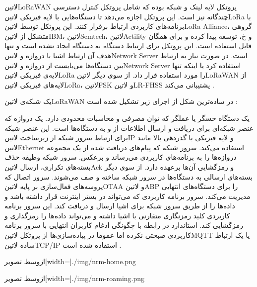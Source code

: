 ‌لاتین{LoRaWAN} پروتکل لایه لینک و شبکه بوده که شامل پروتکل کنترل دسترسی چندگانه نیز است.
این پروتکل اجازه می‌دهد تا دستگاه‌هایی با لایه فیزیکی ‌لاتین{LoRa} با برنامه‌های کاربردی ارتباط برقرار کنند.
این پروتکل توسط ‌لاتین{LoRa Alliance}، گروهی متشکل از ‌لاتین{IBM}، ‌لاتین{Semtech}، ‌لاتین{Actility} و ‌خ،
توسعه پیدا کرده و برای همگان قابل استفاده است.
این پروتکل برای ارتباط دستگاه به دستگاه ایجاد نشده است و تنها هدف آن ارتباط اشیا با دروازه و ‌لاتین{Network Server} است.
در صورت نیاز به ارتباط بین دستگاه‌ها می‌بایست از دروازه و ‌لاتین{Network Server} استفاده کرد یا اینکه
تنها لایه‌ی فیزیکی ‌لاتین{LoRa} را مورد استفاده قرار داد.
از سوی دیگر ‌لاتین{LoRaWAN} از لایه‌های فیزیکی ‌لاتین{LoRa}، ‌لاتین{FSK} و ‌لاتین{LR-FHSS} پشتیبانی می‌کند
.

یک شبکه‌ی ‌لاتین{LoRaWAN} در ساده‌ترین شکل از اجزای زیر تشکیل شده است :

 یک دستگاه حسگر یا عملگر که توان مصرفی و محاسبات محدودی دارد.
 یک دروازه که عنصر شبکه‌ای برای دریافت و ارسال اطلاعات از و به دستگاه‌ها است. این عنصر شبکه برای ارتباط سرور شبکه
از زیرساخت ‌لاتین{IP} و لایه فیزیکی با گذردهی بالا مانند ‌لاتین{Ethernet} استفاده می‌کند.
 سرور شبکه که پیام‌های دریافت شده از یک مجموعه دروازه‌ها را به برنامه‌های کاربردی می‌رساند و برعکس.
سرور شبکه وظیفه حذف بسته‌های تکراری، ارسال ‌لاتین{Ack}
و رمزگشایی آن‌ها برعهده دارد. از سوی دیگر بسته‌های ارسالی به دستگاه‌ها در سرور شبکه ساخته و صف می‌شوند.
 سرور اتصال که پروسه‌های فعال‌سازی بر پایه ‌لاتین{OTAA} و ‌لاتین{ABP} را برای دستگاه‌های انتهایی مدیریت می‌کند.
 سرور برنامه کاربردی که می‌تواند در بستر اینترنت قرار داشته باشد و داده‌ها را از طریق سرور شبکه برای اشیا ارسال و دریافت کند.
این سرور برنامه کاربردی کلید رمزنگاری متقارنی با اشیا داشته و می‌تواند داده‌ها را رمزگذاری و رمزگشایی کند. استاندارد در رابطه با چگونگی ادغام
کاربران انتهایی با سرور برنامه کاربردی صبحتی نکرده اما عموما در پیاده‌سازی‌ها از پروتکل ‌لاتین{MQTT} یا یک ارتباط ساده ‌لاتین{TCP/IP} استفاده شده است .

‌ازوسط
‌تصویر[width=\textwidth]{./img/nrm-home.png}

‌ازوسط
‌تصویر[width=\textwidth]{./img/nrm-roaming.png}

